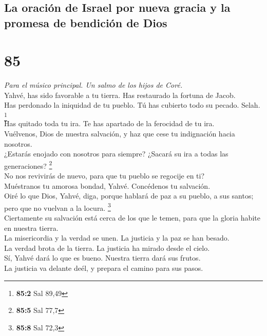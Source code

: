 \hypertarget{la-oraciuxf3n-de-israel-por-nueva-gracia-y-la-promesa-de-bendiciuxf3n-de-dios}{%
\subsection{La oración de Israel por nueva gracia y la promesa de
bendición de
Dios}\label{la-oraciuxf3n-de-israel-por-nueva-gracia-y-la-promesa-de-bendiciuxf3n-de-dios}}

\hypertarget{section-82}{%
\section{85}\label{section-82}}

\emph{Para el músico principal. Un salmo de los hijos de Coré.}\\
 Yahvé, has sido favorable a tu tierra. Has restaurado la
fortuna de Jacob.\\
 Has perdonado la iniquidad de tu pueblo. Tú has cubierto
todo su pecado. Selah. \footnote{\textbf{85:2} Sal 89,49}\\
 Has quitado toda tu ira. Te has apartado de la ferocidad
de tu ira.\\
 Vuélvenos, Dios de nuestra salvación, y haz que cese tu
indignación hacia nosotros.\\
 ¿Estarás enojado con nosotros para siempre? ¿Sacará su
ira a todas las generaciones? \footnote{\textbf{85:5} Sal 77,7}\\
 No nos revivirás de nuevo, para que tu pueblo se regocije
en ti?\\
 Muéstranos tu amorosa bondad, Yahvé. Concédenos tu
salvación.\\
 Oiré lo que Dios, Yahvé, diga, porque hablará de paz a su
pueblo, a sus santos; pero que no vuelvan a la locura. \footnote{\textbf{85:8}
  Sal 72,3}\\
 Ciertamente su salvación está cerca de los que le temen,
para que la gloria habite en nuestra tierra.\\
 La misericordia y la verdad se unen. La justicia y la
paz se han besado.\\
 La verdad brota de la tierra. La justicia ha mirado
desde el cielo.\\
 Sí, Yahvé dará lo que es bueno. Nuestra tierra dará sus
frutos.\\
 La justicia va delante deél, y prepara el camino para
sus pasos.

